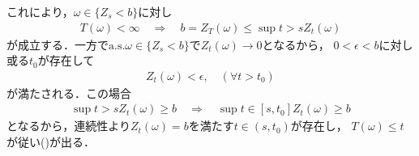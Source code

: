 \begin{prf}
\begin{description}
				これにより，$\omega \in \{Z_s < b\}$に対し
				\begin{align}
					T(\omega) < \infty \quad \Rightarrow \quad b = Z_T(\omega) \leq \sup{t > s}{Z_t(\omega)}
				\end{align}
				が成立する．一方で$\mbox{a.s.}\omega \in \{Z_s < b\}$で$Z_t(\omega) \longrightarrow 0$となるから，
				$0 < \epsilon < b$に対し或る$t_0$が存在して
				\begin{align}
					Z_t(\omega) < \epsilon,
					\quad (\forall t > t_0)
				\end{align}
				が満たされる．この場合
				\begin{align}
					\sup{t > s}{Z_t(\omega)} \geq b
					\quad \Rightarrow \quad
					\sup{t \in [s,t_0]}{Z_t(\omega)} \geq b
				\end{align}
				となるから，連続性より$Z_t(\omega) = b$を満たす$t \in (s,t_0)$が存在し，
				$T(\omega) \leq t$が従い()が出る．
				

\end{description}
\end{prf}
